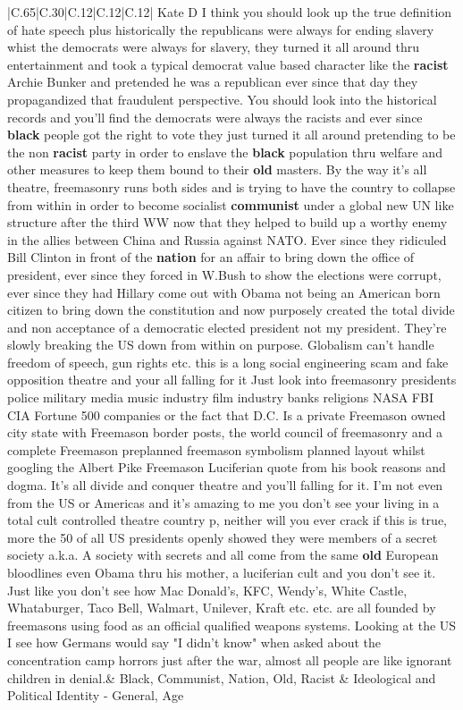 \documentclass[11pt]{article}
\newlength\mylength
\begin{document}
\begin{center}
\begin{longtable}{|C{.65\mylength}|C{.30\mylength}|C{.12\mylength}|C{.12\mylength}|C{.12\mylength}|}
  \small Kate D I think you should look up the true definition of hate speech plus historically the republicans were always for ending slavery whist the democrats were always for slavery, they turned it all around thru entertainment and took a typical democrat value based character like the \textbf{racist} Archie Bunker and pretended he was a republican ever since that day they propagandized that fraudulent perspective. You should look into the historical records and you'll find the democrats were always the racists and ever since \textbf{black} people got the right to vote they just turned it all around pretending to be the non \textbf{racist} party in order to enslave the \textbf{black} population thru welfare and other measures to keep them bound to their \textbf{old} masters. By the way it's all theatre, freemasonry runs both sides and is trying to have the country to collapse from within in order to become socialist \textbf{communist} under a global new UN like structure after the third WW now that they helped to build up a worthy enemy in the allies between China and Russia against NATO. Ever since they ridiculed Bill Clinton in front of the \textbf{nation} for an affair to bring down the office of president, ever since they forced in W.Bush to show the elections were corrupt, ever since they had Hillary come out with Obama not being an American born citizen to bring down the constitution and now purposely created the total divide and non acceptance of a democratic elected president not my president. They're slowly breaking the US down from within on purpose. Globalism can't handle freedom of speech, gun rights etc. this is a long social engineering scam and fake opposition theatre and your all falling for it Just look into freemasonry presidents police military media music industry film industry banks religions NASA FBI CIA Fortune 500 companies or the fact that D.C. Is a private Freemason owned city state with Freemason border posts, the world council of freemasonry and a complete Freemason preplanned freemason symbolism planned layout whilst googling the Albert Pike Freemason Luciferian quote from his book reasons and dogma. It's all divide and conquer theatre and you'll falling for it. I'm not even from the US or Americas and it's amazing to me you don't see your living in a total cult controlled theatre country p, neither will you ever crack if this is true, more the 50 of all US presidents openly showed they were members of a secret society a.k.a. A society with secrets and all come from the same \textbf{old} European bloodlines even Obama thru his mother, a luciferian cult and you don't see it. Just like you don't see how Mac Donald's, KFC, Wendy's, White Castle, Whataburger, Taco Bell, Walmart, Unilever, Kraft etc. etc. are all founded by freemasons using food as an official qualified weapons systems. Looking at the US I see how Germans would say "I didn't know" when asked about the concentration camp horrors just after the war, almost all people are like ignorant children in denial.\normalsize   & Black, Communist, Nation, Old, Racist &  Ideological and Political Identity - General, Age 
\end{longtable}
\end{center}
\end{document}
